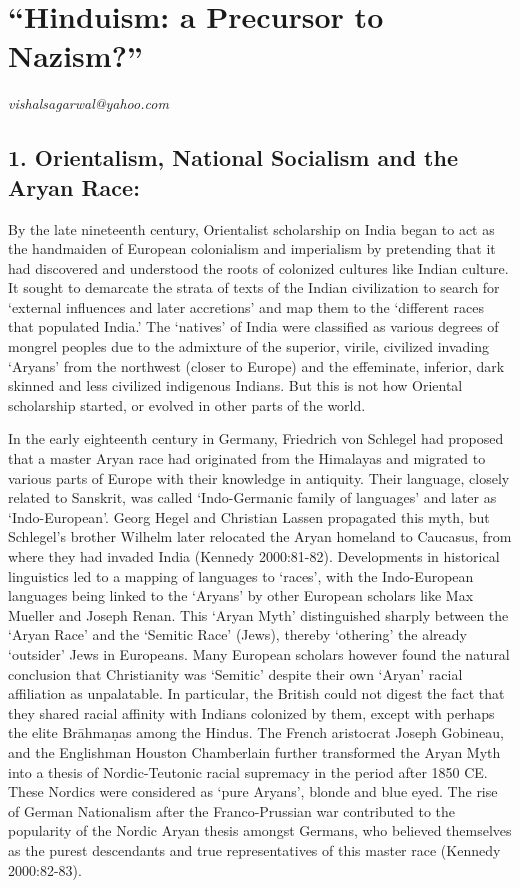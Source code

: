 
\chapter{“Hinduism: a Precursor to Nazism?”}\label{chapter8}


\begin{flushright}
\textit{vishalsagarwal@yahoo.com}
\end{flushright}


\section*{1. Orientalism, National Socialism and the Aryan Race:}

By the late nineteenth century, Orientalist scholarship on India began to act as the handmaiden of European colonialism and imperialism by pretending that it had discovered and understood the roots of colonized cultures like Indian culture. It sought to demarcate the strata of texts of the Indian civilization to search for ‘external influences and later accretions’ and map them to the ‘different races that populated India.’ The ‘natives’ of India were classified as various degrees of mongrel peoples due to the admixture of the superior, virile, civilized invading ‘Aryans’ from the northwest (closer to Europe) and the effeminate, inferior, dark skinned and less civilized indigenous Indians. But this is not how Oriental scholarship started, or evolved in other parts of the world.

In the early eighteenth century in Germany, Friedrich von Schlegel had proposed that a master Aryan race had originated from the Himalayas and migrated to various parts of Europe with their knowledge in antiquity. Their language, closely related to Sanskrit, was called ‘Indo-Germanic family of languages’ and later as ‘Indo-European’. Georg Hegel and Christian Lassen propagated this myth, but Schlegel’s brother Wilhelm later relocated the Aryan homeland to Caucasus, from where they had invaded India (Kennedy 2000:81-82). Developments in historical linguistics led to a mapping of languages to ‘races’, with the Indo-European languages being linked to the ‘Aryans’ by other European scholars like Max Mueller and Joseph Renan. This ‘Aryan Myth’ distinguished sharply between the ‘Aryan Race’ and the ‘Semitic Race’ (Jews), thereby ‘othering’ the already ‘outsider’ Jews in Europeans. Many European scholars however found the natural conclusion that Christianity was ‘Semitic’ despite their own ‘Aryan’ racial affiliation as unpalatable. In particular, the British could not digest the fact that they shared racial affinity with Indians colonized by them, except with perhaps the elite Brāhmaṇas among the Hindus. The French aristocrat Joseph Gobineau, and the Englishman Houston Chamberlain further transformed the Aryan Myth into a thesis of Nordic-Teutonic racial supremacy in the period after 1850 CE. These Nordics were considered as ‘pure Aryans’, blonde and blue eyed. The rise of German Nationalism after the Franco-Prussian war contributed to the popularity of the Nordic Aryan thesis amongst Germans, who believed themselves as the purest descendants and true representatives of this master race (Kennedy 2000:82-83).

